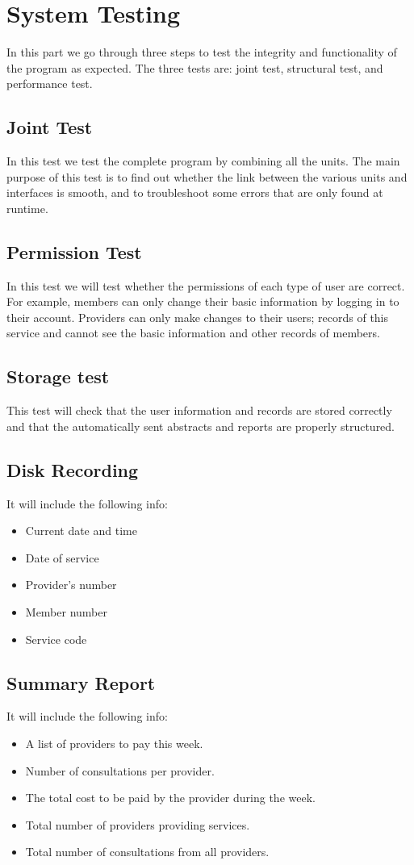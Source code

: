 \documentclass{article}
\begin{document}
\section{System Testing}
In this part we go through three steps to test the integrity and functionality of the
program as expected. The three tests are: joint test, structural test, and
performance test.
\subsection{Joint Test}
In this test we test the complete program by combining all the units. The
main purpose of this test is to find out whether the link between the various
units and interfaces is smooth, and to troubleshoot some errors that are
only found at runtime.
\subsection{Permission Test}
In this test we will test whether the permissions of each type of user are
correct. For example, members can only change their basic information by
logging in to their account. Providers can only make changes to their
users; records of this service and cannot see the basic information and
other records of members.
\subsection{Storage test}
This test will check that the user information and records are stored
correctly and that the automatically sent abstracts and reports are properly
structured.
\subsection{Disk Recording}
It will include the following info:
\begin{itemize}
   \item Current date and time
   \item Date of service
   \item Provider's number
   \item Member number
   \item Service code
\end{itemize}

\subsection{Summary Report}
It will include the following info:
\begin{itemize}
   \item A list of providers to pay this week.
   \item Number of consultations per provider.
   \item The total cost to be paid by the provider during the week.
   \item Total number of providers providing services.
   \item Total number of consultations from all providers.
\end{itemize}
\end{document}
